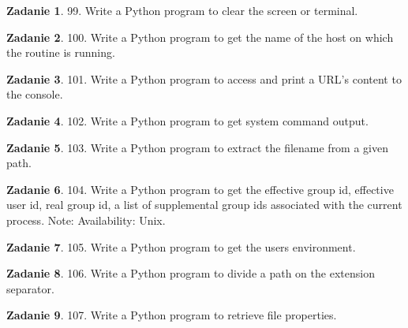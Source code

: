 \documentclass[11pt]{article}
\theoremstyle{definition}
\newtheorem{zadanie}{Zadanie}
\begin{document}
\begin{zadanie}


99. Write a Python program to clear the screen or terminal. 

\end{zadanie}

\begin{zadanie}


100. Write a Python program to get the name of the host on which the routine is running. 

\end{zadanie}

\begin{zadanie}


101. Write a Python program to access and print a URL's content to the console. 

\end{zadanie}

\begin{zadanie}


102. Write a Python program to get system command output. 

\end{zadanie}

\begin{zadanie}


103. Write a Python program to extract the filename from a given path. 

\end{zadanie}

\begin{zadanie}


104. Write a Python program to get the effective group id, effective user id, real group id, a list of supplemental group ids associated with the current process. 
Note: Availability: Unix.

\end{zadanie}

\begin{zadanie}


105. Write a Python program to get the users environment. 

\end{zadanie}

\begin{zadanie}


106. Write a Python program to divide a path on the extension separator. 

\end{zadanie}

\begin{zadanie}


107. Write a Python program to retrieve file properties. 

\end{zadanie}
\end{document}
